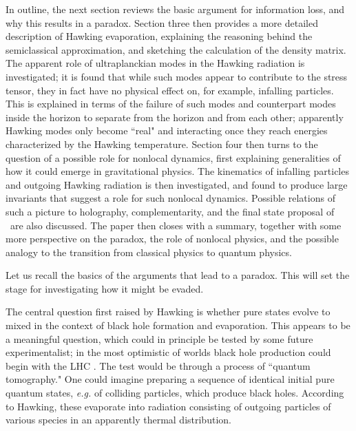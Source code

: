 In outline, the next section  reviews the basic argument for information loss, and why this results in a paradox.  Section three then provides a more detailed description of Hawking evaporation, explaining the reasoning behind the semiclassical approximation, and sketching the calculation of the density matrix.  The apparent role of ultraplanckian modes in the Hawking radiation is investigated; it is found that while such modes appear to contribute to the stress tensor, they in fact have no physical effect on, for example, infalling particles.  This is explained in terms of the failure of such modes and counterpart modes inside the horizon to separate from the horizon and from each other;
apparently Hawking modes only become ``real" and interacting once they reach energies characterized by the Hawking temperature.  Section four then turns to the question of a possible role for nonlocal dynamics, first explaining generalities of how it could emerge in gravitational physics.  The kinematics of infalling particles and outgoing Hawking radiation is then investigated, and found to produce large invariants that suggest a role for such nonlocal dynamics.  Possible relations of such a picture to holography, complementarity, and the final state proposal of \HoMa\ are also discussed.  The paper then closes with a summary, together with some more perspective on the paradox, the role of nonlocal physics, and the possible analogy to the transition from classical physics to quantum physics.



Let us recall the basics of the arguments that lead to a paradox. This will set the stage for investigating how it might be evaded.

The central question first raised by Hawking  is whether pure states evolve to mixed in the context of black hole formation and evaporation.  This appears to be a meaningful question, which could in principle be tested by some future experimentalist; in the most optimistic of worlds black hole production could begin with the LHC . The test would be through a process of  ``quantum tomography."  One could imagine preparing a sequence of identical initial pure quantum states, {\it e.g.} of colliding particles, which produce black holes.  According to Hawking, these evaporate into radiation  consisting of outgoing particles of various species in an apparently thermal distribution.

